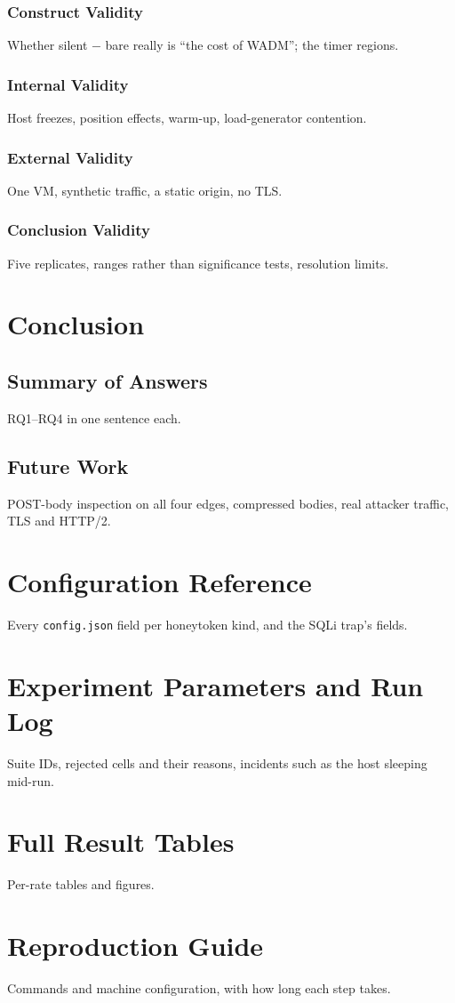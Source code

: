 \documentclass{rptuma}
\begin{document}
\subsection{Construct Validity}
Whether silent $-$ bare really is ``the cost of WADM''; the timer regions.
\subsection{Internal Validity}
Host freezes, position effects, warm-up, load-generator contention.
\subsection{External Validity}
One VM, synthetic traffic, a static origin, no TLS.
\subsection{Conclusion Validity}
Five replicates, ranges rather than significance tests, resolution limits.

\chapter{Conclusion}
\section{Summary of Answers}
RQ1--RQ4 in one sentence each.
\section{Future Work}
POST-body inspection on all four edges, compressed bodies, real attacker traffic, TLS and HTTP/2.

\appendix
\chapter{Configuration Reference}
Every \texttt{config.json} field per honeytoken kind, and the SQLi trap's fields.
\chapter{Experiment Parameters and Run Log}
Suite IDs, rejected cells and their reasons, incidents such as the host sleeping mid-run.
\chapter{Full Result Tables}
Per-rate tables and figures.
\chapter{Reproduction Guide}
Commands and machine configuration, with how long each step takes.



\end{document}

